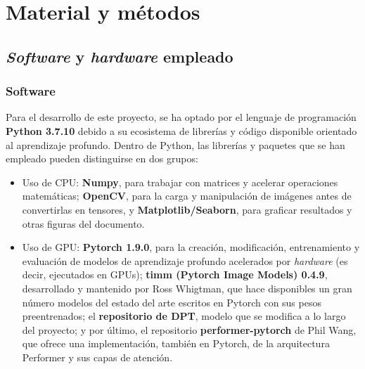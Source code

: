 \section{Material y métodos}

\subsection{\textit{Software} y \textit{hardware} empleado}

\subsubsection{Software}


Para el desarrollo de este proyecto, se ha optado por el lenguaje de programación \textbf{Python 3.7.10} debido a su ecosistema de librerías y código disponible orientado al aprendizaje profundo. Dentro de Python, las librerías y paquetes que se han empleado pueden distinguirse en dos grupos: 
\begin{itemize}
\item Uso de CPU: \textbf{Numpy}, para trabajar con matrices y acelerar operaciones matemáticas; \textbf{OpenCV}, para la carga y manipulación de imágenes antes de convertirlas en tensores, y \textbf{Matplotlib/Seaborn}, para graficar resultados y otras figuras del documento.
\item Uso de GPU: \textbf{Pytorch 1.9.0}, para la creación, modificación, entrenamiento y evaluación de modelos de aprendizaje profundo acelerados por \textit{hardware} (es decir, ejecutados en GPUs); \textbf{timm (Pytorch Image Models) 0.4.9}, desarrollado y mantenido por Ross Whigtman, que hace disponibles un gran número modelos del estado del arte escritos en Pytorch con sus pesos preentrenados; el \textbf{repositorio de DPT}, modelo que se modifica a lo largo del proyecto; y por último, el repositorio \textbf{performer-pytorch} de Phil Wang, que ofrece una implementación, también en Pytorch, de la arquitectura Performer y sus capas de atención.
\end{itemize}

